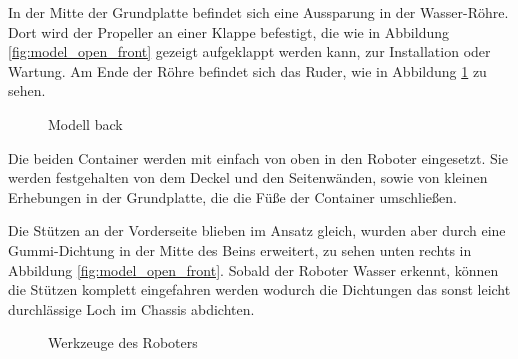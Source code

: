 In der Mitte der Grundplatte befindet sich eine Aussparung in der Wasser-Röhre.
Dort wird der Propeller an einer Klappe befestigt,
die wie in Abbildung \ref{fig:model_open_front} gezeigt
aufgeklappt werden kann, 
zur Installation oder Wartung.
Am Ende der Röhre befindet sich das Ruder, 
wie in Abbildung \ref{fig:model_open_back} zu sehen.

\begin{figure}[H]
  \caption{Modell back}
  \label{fig:model_open_back}
\end{figure}

Die beiden Container werden mit einfach von oben in den Roboter eingesetzt.
Sie werden festgehalten von dem Deckel und den Seitenwänden,
sowie von kleinen Erhebungen in der Grundplatte,
die die Füße der Container umschließen.

Die Stützen an der Vorderseite blieben im Ansatz gleich,
wurden aber durch eine Gummi-Dichtung in der Mitte des Beins erweitert,
zu sehen unten rechts in Abbildung \ref{fig:model_open_front}.
Sobald der Roboter Wasser erkennt, 
können die Stützen komplett eingefahren werden
wodurch die Dichtungen das sonst leicht durchlässige Loch im Chassis abdichten.

\begin{figure}[H]
  \caption{Werkzeuge des Roboters}
  \label{fig:model_closeup}
\end{figure}

